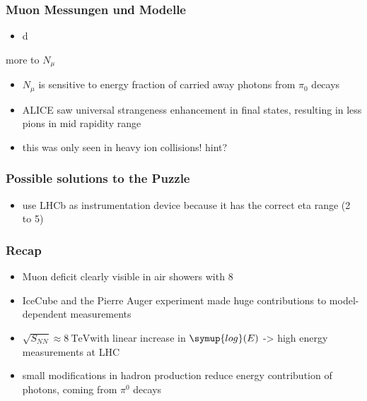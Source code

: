 \documentclass[aspectratio=1610, 9pt]{beamer}
\begin{document}
\begin{frame}\frametitle{Muon Messungen und Modelle}
  \begin{itemize}
    \item d
  \end{itemize}
\end{frame}

\begin{frame}{more to $N_\mu$}
  \begin{itemize}
    \item $N_\mu$ is sensitive to energy fraction of carried away photons from $\pi_0$ decays
    \item ALICE saw universal strangeness enhancement in final states, resulting in less pions in mid rapidity range
    \item this was only seen in heavy ion collisions! hint?
  \end{itemize}
\end{frame}

\begin{frame}\frametitle{Possible solutions to the Puzzle}
  \begin{itemize}
    \item use LHCb as instrumentation device because it has the correct eta range (2 to 5)
  \end{itemize}
\end{frame}

\begin{frame}\frametitle{Recap}
  \begin{itemize}
    \item Muon deficit clearly visible in air showers with 8\sigma
    \item IceCube and the Pierre Auger experiment made huge contributions to model-dependent measurements
    \item $\sqrt{S_{NN}} \approx \SI{8}{\tera\electronvolt}$with linear increase in $\symup{log}(E)$ -> high energy measurements at LHC
    \item small modifications in hadron production reduce energy contribution of photons, coming from $\pi^{0}$ decays
  \end{itemize}
\end{frame}
\end{document}
